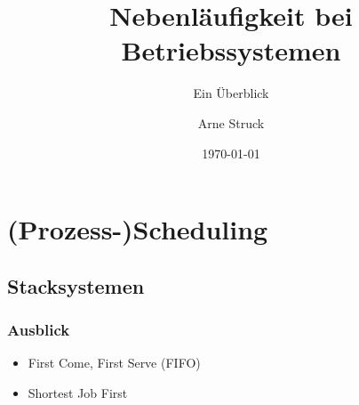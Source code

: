 \documentclass{beamer}
\title{Nebenläufigkeit bei Betriebssystemen}
\subtitle{Ein Überblick}
\author{Arne Struck}
\institute{Universität Hamburg}
\date{\today}
\begin{document}
	\begin{frame}[plain]
		\titlepage
	\end{frame}
	
	\begin{frame}
		\tableofcontents
	\end{frame}

	\section{(Prozess-)Scheduling}
		\subsection{Stacksystemen}
			\begin{frame}
				\frametitle{Ausblick}
				\begin{itemize}
					\item First Come, First Serve (FIFO)
					\item Shortest Job First
				\end{itemize}
			\end{frame}
			
\end{document}
